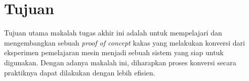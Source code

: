 \section{Tujuan}

Tujuan utama makalah tugas akhir ini adalah untuk mempelajari dan mengembangkan sebuah \textit{proof of concept} kakas yang melakukan konversi dari eksperimen pemelajaran mesin menjadi sebuah sistem yang siap untuk digunakan.
Dengan adanya makalah ini, diharapkan proses konversi secara praktiknya dapat dilakukan dengan lebih efisien.
